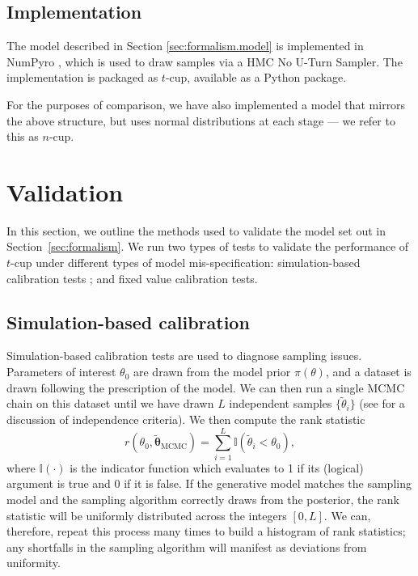 \documentclass[fleqn,usenatbib]{rasti}
\begin{document}
\subsection{Implementation}
\label{sec:formalism.implementation}

The model described in Section \ref{sec:formalism.model} is implemented in
NumPyro \citep{NumPyro, Pyro}, which is used to draw samples via a HMC No U-Turn
Sampler. The implementation is packaged as $t$-cup, available as a Python
package\footnotemark.

For the purposes of comparison, we have also implemented a model that mirrors
the above structure, but uses normal distributions at each stage --- we refer to
this as $n$-cup.


\section{Validation}
\label{sec:methods}

In this section, we outline the methods used to validate the model set out in
Section~\ref{sec:formalism}. We run two types of tests to validate the performance of
$t$-cup under different types of model mis-specification: simulation-based
calibration tests \citep{Cook:2006, Talts:2018}; and fixed value calibration
tests.

\subsection{Simulation-based calibration}
\label{sec:methods.sbc}

Simulation-based calibration tests \citep{Cook:2006, Talts:2018} are used to
diagnose sampling issues. Parameters of interest $\theta_0$ are drawn from the
model prior $\pi(\theta)$, and a dataset is drawn following the prescription of
the model. We can then run a single MCMC chain on this dataset until we have
drawn $L$ independent samples $\{\tilde{\theta}_{i}\}$ (see \citet{Talts:2018}
for a discussion of independence criteria). We then compute the rank statistic
\begin{equation}
    r(\theta_0, \tilde{\boldsymbol{\theta}}_{\text{MCMC}})
        = \sum_{i = 1}^{L} \mathbb I (\tilde{\theta}_i < \theta_0),
\end{equation}
where $\mathbb{I}(\cdot)$ is the indicator function which evaluates to 1 if its (logical) argument is true and 0 if it is false.
If the generative model matches the sampling model and the sampling algorithm
correctly draws from the posterior, the rank statistic will be uniformly
distributed across the integers $[0, L]$. We can, therefore, repeat this process
many times to build a histogram of rank statistics; any shortfalls in the
sampling algorithm will manifest as deviations from uniformity.
\end{document}
